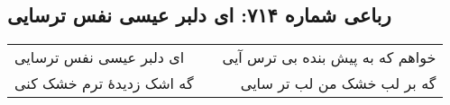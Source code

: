 \begin{center}
\section*{رباعی شماره ۷۱۴: ای دلبر عیسی نفس ترسایی}
\label{sec:sh714}
\begin{longtable}{l p{0.5cm} r}
ای دلبر عیسی نفس ترسایی
&&
خواهم که به پیش بنده بی ترس آیی
\\
گه اشک زدیدهٔ ترم خشک کنی
&&
گه بر لب خشک من لب تر سایی
\\
\end{longtable}
\end{center}
